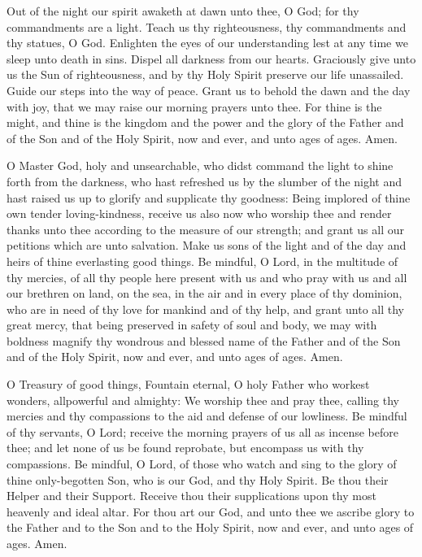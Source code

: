  Out of the night our spirit awaketh at dawn unto thee, O God; for thy commandments are a light. Teach us thy righteousness, thy commandments and thy statues, O God. Enlighten the eyes of our understanding lest at any time we sleep unto death in sins. Dispel all darkness from our hearts. Graciously give unto us the Sun of righteousness, and by thy Holy Spirit preserve our life unassailed. Guide our steps into the way of peace. Grant us to behold the dawn and the day with joy, that we may raise our morning prayers unto thee. For thine is the might, and thine is the kingdom and the power and the glory of the Father and of the Son and of the Holy Spirit, now and ever, and unto ages of ages. Amen.

 O Master God, holy and unsearchable, who didst command the light to shine forth from the darkness, who hast refreshed us by the slumber of the night and hast raised us up to glorify and supplicate thy goodness: Being implored of thine own tender loving-kindness, receive us also now who worship thee and render thanks unto thee according to the measure of our strength; and grant us all our petitions which are unto salvation. Make us sons of the light and of the day and heirs of thine everlasting good things. Be mindful, O Lord, in the multitude of thy mercies, of all thy people here present with us and who pray with us and all our brethren on land, on the sea, in the air and in every place of thy dominion, who are in need of thy love for mankind and of thy help, and grant unto all thy great mercy, that being preserved in safety of soul and body, we may with boldness magnify thy wondrous and blessed name of the Father and of the Son and of the Holy Spirit, now and ever, and unto ages of ages. Amen.

 O Treasury of good things, Fountain eternal, O holy Father who workest wonders, allpowerful and almighty: We worship thee and pray thee, calling thy mercies and thy compassions to the aid and defense of our lowliness. Be mindful of thy servants, O Lord; receive the morning prayers of us all as incense before thee; and let none of us be found reprobate, but encompass us with thy compassions. Be mindful, O Lord, of those who watch and sing to the glory of thine only-begotten Son, who is our God, and thy Holy Spirit. Be thou their Helper and their Support. Receive thou their supplications upon thy most heavenly and ideal altar. For thou art our God, and unto thee we ascribe glory to the Father and to the Son and to the Holy Spirit, now and ever, and unto ages of ages. Amen.

